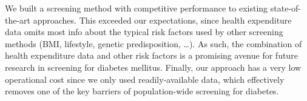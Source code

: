 We built a screening method with competitive performance to existing state-of-the-art approaches. This exceeded our expectations, since health expenditure data omits most info about the typical risk factors used by other screening methods (BMI, lifestyle, genetic predisposition, \ldots). As such, the combination of health expenditure data and other risk factors is a promising avenue for future research in screening for diabetes mellitus. Finally, our approach has a very low operational cost since we only used readily-available data, which effectively removes one of the key barriers of population-wide screening for diabetes.

\cleardoublepage

